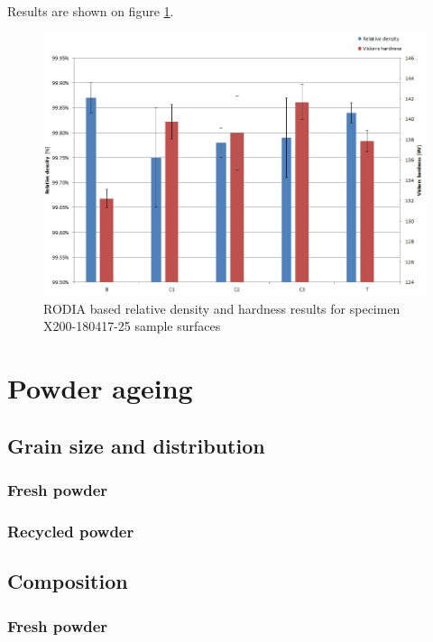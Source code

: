Results are shown on figure \ref{fig:HD-180417}.	

\begin{figure}[ht]
\centering
\centerline{\includegraphics[scale=0.62]{Images/HD-180417}}
\decoRule
\caption[RODIA based relative density and hardness results for specimen X200-180417-25 sample surfaces]{RODIA based relative density and hardness results for specimen X200-180417-25 sample surfaces}
\label{fig:HD-180417}
\end{figure} 

\section{Powder ageing}

\subsection{Grain size and distribution}
\subsubsection{Fresh powder}

\subsubsection{Recycled powder}
\subsection{Composition}

\subsubsection{Fresh powder}

